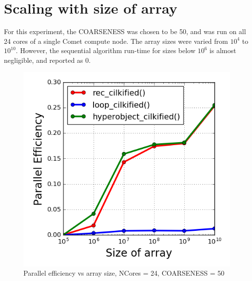 \documentclass[12pt,letterpaper]{article}
\begin{document}
\section*{Scaling with size of array}
\noindent For this experiment, the COARSENESS was chosen to be 50, and was run on all 24 cores of a single Comet compute node. The array sizes were varied from $10^4$ to $10^10$. However, the sequential algorithm run-time for sizes below $10^6$ is almost negligible, and reported as 0.
%
\begin{figure}[h]
\centering
\includegraphics[scale=0.45]{arrsize_scaling.png}
\caption{Parallel efficiency vs array size, NCores = 24, COARSENESS = 50}
\end{figure}
%
\end{document}
